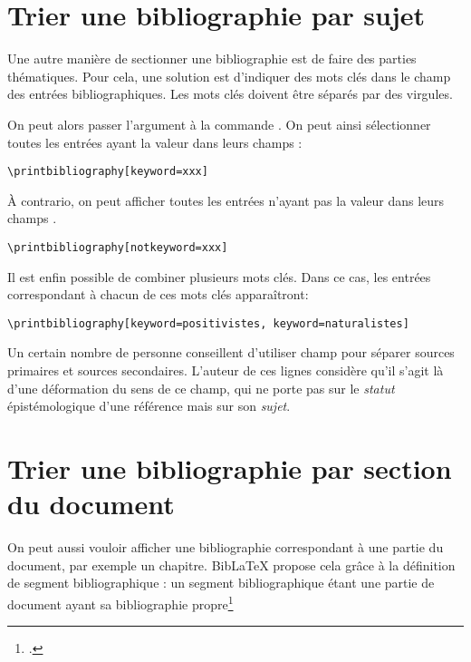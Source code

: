 \section{Trier une bibliographie par sujet}

Une autre manière de  sectionner une bibliographie est de faire des parties thématiques. Pour cela, une solution est d'indiquer des mots clés dans le champ  des entrées bibliographiques. Les mots clés doivent être séparés par des virgules.

On peut alors passer l'argument  à la commande . On peut ainsi sélectionner toutes les entrées ayant la valeur  dans leurs champs  :

\begin{verbatim}
\printbibliography[keyword=xxx]
\end{verbatim}

À contrario, on peut afficher toutes les entrées n'ayant pas la valeur  dans leurs champs .

\begin{verbatim}
\printbibliography[notkeyword=xxx]
\end{verbatim}

Il est enfin possible de combiner plusieurs mots clés. Dans ce cas, les entrées correspondant à chacun de ces mots clés apparaîtront:

\begin{verbatim}
\printbibliography[keyword=positivistes, keyword=naturalistes]
\end{verbatim}

\begin{plusloins}
	Un certain nombre de personne conseillent d'utiliser champ pour séparer sources primaires et sources secondaires. L'auteur de ces lignes considère qu'il s'agit là d'une déformation du sens de ce champ, qui ne porte pas sur le \emph{statut} épistémologique d'une référence mais sur son \emph{sujet}. 
\end{plusloins}

\section{Trier une bibliographie par section du document}

On peut aussi vouloir afficher une bibliographie correspondant à une partie du document, par exemple un chapitre. BibLaTeX propose cela grâce à la définition de segment bibliographique : un segment bibliographique étant une partie de document ayant sa bibliographie propre\footcites[En réalité  propose deux choses différentes : \enquote{segment} et \enquote{section} bibliographique. Seules les sections bibliographiques ont \enquote{réellement} une bibliographie propre, dans la mesure où, si on utilise un style \enquote{numeroté} de bibliographie, la numérotation recommence à chaque changement de section, mais pas à chaque changement de segment. Toutefois il est rare en science humaine d'utiliser un style bibliographique numéroté. C'est pourquoi nous ne parlons ici que des segments bibliographiques et non pas des sections bibliographiques.][]{biblatex_section}{biblatex_segment}

